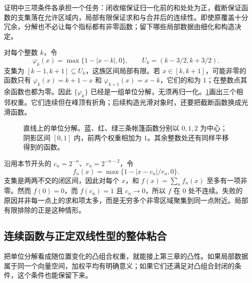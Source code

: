 证明中三项条件各承担一个任务：闭收缩保证归一化前的和处处为正，截断保证函数的支集落在允许区域内，局部有限保证求和与合并后的连续性。即使原覆盖十分冗余，分解也不必让每个指标都有非零函数；留下哪些局部数据由细化和构造决定。

\begin{example}\label{g1:exm:hat-partition}
	对每个整数 \(k\)，令
	\[
		\varphi_k(x)=\max\{1-|x-k|,0\},\qquad U_k=(k-3/2,k+3/2).
	\]
	支集为 \([k-1,k+1]\subseteq U_k\)，这族区间局部有限。若 \(x\in[k,k+1]\)，可能非零的函数只有 \(\varphi_k(x)=k+1-x\) 和 \(\varphi_{k+1}(x)=x-k\)，它们的和为 \(1\)；在整数点其余函数也都为零。因此 \(\{\varphi_k\}\) 已经是一组单位分解，无须再归一化。\cref{g1:fig:hat-partition}画出三个相邻权重。它们连续但在峰顶有折角；后续构造光滑对象时，还要把截断函数换成光滑函数。
\end{example}

\begin{figure}[htbp]
	\centering
	
	\caption[直线上的单位分解]{直线上的单位分解。蓝、红、绿三条帐篷函数分别以 \(0,1,2\) 为中心；阴影区间 \([0,1]\) 内，前两个权重相加为 \(1\)。其余整数处还有同样平移得到的函数。}
	\label{g1:fig:hat-partition}
\end{figure}

\begin{example}\label{g1:exm:pointfinite-sum}
	沿用本节开头的 \(c_n=2^{-n}\)、\(r_n=2^{-n-2}\)，令
	\[
		f_n(x)=\max\{1-|x-c_n|/r_n,0\}.
	\]
	支集是两两不交的闭区间，因此对每个 \(x\)，和 \(f(x)=\sum_nf_n(x)\) 至多有一项非零。然而 \(f(0)=0\)，而 \(f(c_n)=1\) 且 \(c_n\to0\)，所以 \(f\) 在 \(0\) 处不连续。失败的原因并非每一点上的求和项太多，而是无穷多个非零区域聚集到同一点附近。局部有限排除的正是这种情形。
\end{example}

\subsection{连续函数与正定双线性型的整体粘合}
\label{g1:subsec:0404:04}

把单位分解看成随位置变化的凸组合权重，就能接上第三章的凸性。如果局部数据属于同一个向量空间，加权平均有明确意义；如果它们还满足对凸组合封闭的条件，这个条件也能保留下来。

